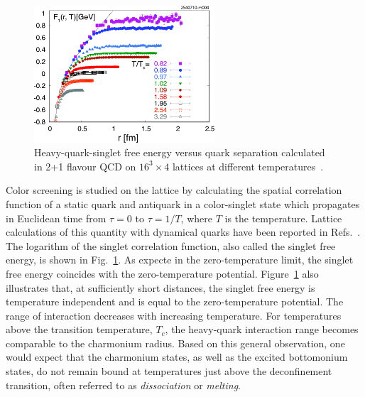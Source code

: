 \begin{figure}[h]
   \begin{center}
      \includegraphics[width=0.6\textwidth]{Figures/LattSingEnergy.pdf}
      \caption{Heavy-quark-singlet free energy versus quark separation 
               calculated in 2+1 flavour QCD
              on $16^3 \times 4$ lattices at different 
               temperatures~\cite{Petreczky:2009ip,Petreczky:2010yn}.  
               }
      \label{Fig:LatticeSingEner}
   \end{center}
\end{figure}
Color screening is studied on the lattice by 
calculating the spatial correlation function of a static quark and
antiquark in a color-singlet state which propagates in Euclidean time 
from $\tau=0$ to $\tau=1/T$, where $T$ is the temperature.
Lattice calculations of this quantity with dynamical quarks have been
reported in Refs.~\cite{Kaczmarek:2002mc,Petreczky:2009ip,Petreczky:2010yn}.
The logarithm of the singlet
correlation function, also called the singlet free energy,
is shown in Fig.~\ref{Fig:LatticeSingEner}. 
As expecte in the zero-temperature limit,
the singlet free energy coincides with the zero-temperature potential. 
Figure~\ref{Fig:LatticeSingEner} also illustrates that,
at sufficiently short distances, the singlet free energy is
temperature independent and is equal to the zero-temperature potential. 
The range of interaction decreases with increasing temperature.  For 
temperatures above the transition temperature, $T_c$, the heavy-quark 
interaction range becomes comparable to the charmonium radius. Based on 
this general observation, one would expect that the charmonium
states, as well as the excited bottomonium states, do not remain bound at
temperatures just above the deconfinement transition, often referred to as 
{\em dissociation} or {\em melting}. 

